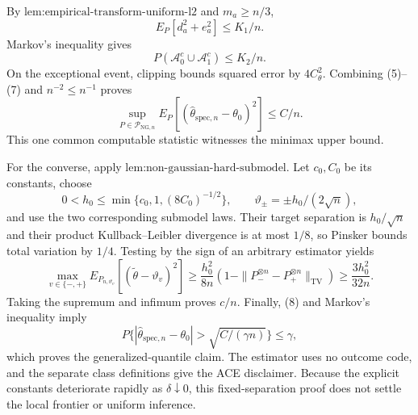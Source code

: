 By \(\text{lem:empirical-transform-uniform-l2}\) and \(m_a\ge n/3\),
\[
 E_P[d_a^2+e_a^2]\le K_1/n. \tag{6}
\]
Markov's inequality gives
\[
 P(\mathcal A_0^c\cup\mathcal A_1^c)\le K_2/n. \tag{7}
\]
On the exceptional event, clipping bounds squared error by \(4C_{\theta}^2\).  Combining (5)--(7) and \(n^{-2}\le n^{-1}\) proves
\[
 \sup_{P\in\mathcal P_{\mathrm{NG},n}}
 E_P[(\widehat\theta_{\mathrm{spec},n}-\theta_0)^2]\le C/n. \tag{8}
\]
This one common computable statistic witnesses the minimax upper bound.

For the converse, apply \(\text{lem:non-gaussian-hard-submodel}\).  Let \(c_0,C_0\) be its constants, choose
\[
 0<h_0\le\min\{c_0,1,(8C_0)^{-1/2}\},\qquad
 \vartheta_{\pm}=\pm h_0/(2\sqrt n),
\]
and use the two corresponding submodel laws.  Their target separation is \(h_0/\sqrt n\) and their product Kullback--Leibler divergence is at most \(1/8\), so Pinsker bounds total variation by \(1/4\).  Testing by the sign of an arbitrary estimator yields
\[
 \max_{v\in\{-,+\}}E_{P_{n,\vartheta_v}}
 [(\widetilde\theta-\vartheta_v)^2]
 \ge\frac{h_0^2}{8n}(1-\|P_-^{\otimes n}-P_+^{\otimes n}\|_{\mathrm{TV}})
 \ge\frac{3h_0^2}{32n}.
\]
Taking the supremum and infimum proves \(c/n\).  Finally, (8) and Markov's inequality imply
\[
 P\{|\widehat\theta_{\mathrm{spec},n}-\theta_0|>\sqrt{C/(\gamma n)}\}\le\gamma,
\]
which proves the generalized-quantile claim.  The estimator uses no outcome code, and the separate class definitions give the ACE disclaimer.  Because the explicit constants deteriorate rapidly as \(\delta\downarrow0\), this fixed-separation proof does not settle the local frontier or uniform inference.